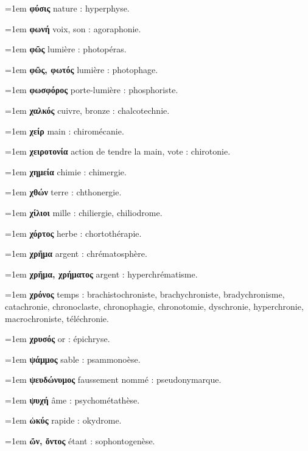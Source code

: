 \hangindent=1em \textbf{φύσις} nature : hyperphyse.\par
\hangindent=1em \textbf{φωνή} voix, son : agoraphonie.\par
\hangindent=1em \textbf{φῶς} lumière : photopéras.\par
\hangindent=1em \textbf{φῶς, φωτός} lumière : photophage.\par
\hangindent=1em \textbf{φωσφόρος} porte-lumière : phosphoriste.\par
\hangindent=1em \textbf{χαλκός} cuivre, bronze : chalcotechnie.\par
\hangindent=1em \textbf{χείρ} main : chiromécanie.\par
\hangindent=1em \textbf{χειροτονία} action de tendre la main, vote : chirotonie.\par
\hangindent=1em \textbf{χημεία} chimie : chimergie.\par
\hangindent=1em \textbf{χθών} terre : chthonergie.\par
\hangindent=1em \textbf{χίλιοι} mille : chiliergie, chiliodrome.\par
\hangindent=1em \textbf{χόρτος} herbe : chortothérapie.\par
\hangindent=1em \textbf{χρῆμα} argent : chrématosphère.\par
\hangindent=1em \textbf{χρῆμα, χρήματος} argent : hyperchrématisme.\par
\hangindent=1em \textbf{χρόνος} temps : brachistochroniste, brachychroniste, bradychronisme, catachronie, chronoclaste, chronophagie, chronotomie, dyschronie, hyperchronie, macrochroniste, téléchronie.\par
\hangindent=1em \textbf{χρυσός} or : épichryse.\par
\hangindent=1em \textbf{ψάμμος} sable : psammonoèse.\par
\hangindent=1em \textbf{ψευδώνυμος} faussement nommé : pseudonymarque.\par
\hangindent=1em \textbf{ψυχή} âme : psychométathèse.\par
\hangindent=1em \textbf{ὠκύς} rapide : okydrome.\par
\hangindent=1em \textbf{ὤν, ὄντος} étant : sophontogenèse.\par
{}\par\smallskip
